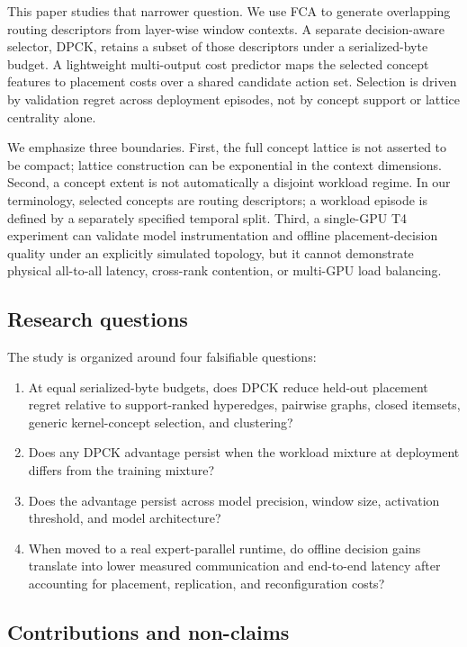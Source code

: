 \documentclass[a4paper,preprint,review,12pt,authoryear]{elsarticle}
\begin{document}
This paper studies that narrower question. We use FCA to generate overlapping routing descriptors from layer-wise window contexts. A separate decision-aware selector, DPCK, retains a subset of those descriptors under a serialized-byte budget. A lightweight multi-output cost predictor maps the selected concept features to placement costs over a shared candidate action set. Selection is driven by validation regret across deployment episodes, not by concept support or lattice centrality alone.

We emphasize three boundaries. First, the full concept lattice is not asserted to be compact; lattice construction can be exponential in the context dimensions. Second, a concept extent is not automatically a disjoint workload regime. In our terminology, selected concepts are routing descriptors; a workload episode is defined by a separately specified temporal split. Third, a single-GPU T4 experiment can validate model instrumentation and offline placement-decision quality under an explicitly simulated topology, but it cannot demonstrate physical all-to-all latency, cross-rank contention, or multi-GPU load balancing.

\subsection{Research questions}

The study is organized around four falsifiable questions:
\begin{enumerate}[leftmargin=*,label=\textbf{RQ\arabic*:}]
  \item At equal serialized-byte budgets, does DPCK reduce held-out placement regret relative to support-ranked hyperedges, pairwise graphs, closed itemsets, generic kernel-concept selection, and clustering?
  \item Does any DPCK advantage persist when the workload mixture at deployment differs from the training mixture?
  \item Does the advantage persist across model precision, window size, activation threshold, and model architecture?
  \item When moved to a real expert-parallel runtime, do offline decision gains translate into lower measured communication and end-to-end latency after accounting for placement, replication, and reconfiguration costs?
\end{enumerate}

\subsection{Contributions and non-claims}
\end{document}
